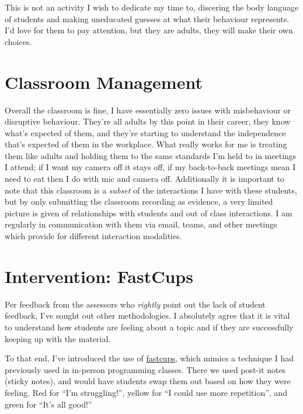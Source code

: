 \documentclass[paper=a4,justified,a4paper]{tufte-handout}
\begin{document}
This is not an activity I wish to dedicate my time to, discering the
body language of students and making uneducated guesses at what their
behaviour represents. I'd love for them to pay attention, but they are
adults, they will make their own choices.

\hypertarget{classroom-management}{%
\section{Classroom Management}\label{classroom-management}}

Overall the classroom is fine, I have essentially zero issues with
misbehaviour or disruptive behaviour. They're all adults by this point
in their career, they know what's expected of them, and they're starting
to understand the independence that's expected of them in the workplace.
What really works for me is treating them like adults and holding them
to the same standards I'm held to in meetings I attend; if I want my
camera off it stays off, if my back-to-back meetings mean I need to eat
then I do with mic and camera off. Additionally it is important to note
that this classroom is a \emph{subset} of the interactions I have with
these students, but by only submitting the classroom recording as
evidence, a very limited picture is given of relationships with students
and out of class interactions. I am regularly in communication with them
via email, teams, and other meetings which provide for different
interaction modalities.

\hypertarget{intervention-fastcups}{%
\section{Intervention: FastCups}\label{intervention-fastcups}}

Per feedback from the assessors who \emph{rightly} point out the lack of
student feedback, I've sought out other methodologies. I absolutely
agree that it is vital to understand how students are feeling about a
topic and if they are successfully keeping up with the material.

To that end, I've introduced the use of
\href{http://cups.fast.ai/}{fastcups}, which mimics a technique I had
previously used in in-person programming classes. There we used post-it
notes (sticky notes), and would have students swap them out based on how
they were feeling. Red for ``I'm struggling!'', yellow for ``I could use
more repetition'', and green for ``It's all good!''
\end{document}
